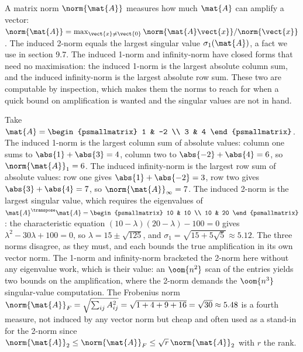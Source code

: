 A matrix norm $\norm{\mat{A}}$ measures how much $\mat{A}$ can
amplify a vector: $\norm{\mat{A}} = \max_{\vect{x} \neq \vect{0}}
\norm{\mat{A}\vect{x}}/\norm{\vect{x}}$. The induced 2-norm equals
the largest singular value $\sigma_{1}(\mat{A})$, a fact we use in
section 9.7. The induced 1-norm and infinity-norm have closed forms
that need no maximisation: the induced 1-norm is the largest
absolute column sum, and the induced infinity-norm is the largest
absolute row sum. These two are computable by inspection, which makes
them the norms to reach for when a quick bound on amplification is
wanted and the singular values are not in hand.

\begin{example}
Take $\mat{A} = \begin{psmallmatrix} 1 & -2 \\ 3 & 4
\end{psmallmatrix}$. The induced 1-norm is the largest column sum of
absolute values: column one sums to $\abs{1} + \abs{3} = 4$, column
two to $\abs{-2} + \abs{4} = 6$, so $\norm{\mat{A}}_{1} = 6$. The
induced infinity-norm is the largest row sum of absolute values: row
one gives $\abs{1} + \abs{-2} = 3$, row two gives $\abs{3} + \abs{4}
= 7$, so $\norm{\mat{A}}_{\infty} = 7$. The induced 2-norm is the
largest singular value, which requires the eigenvalues of
$\mat{A}^{\transpose}\mat{A} = \begin{psmallmatrix} 10 & 10 \\ 10 &
20 \end{psmallmatrix}$: the characteristic equation $(10 - \lambda)
(20 - \lambda) - 100 = 0$ gives $\lambda^{2} - 30\lambda + 100 = 0$,
so $\lambda = 15 \pm \sqrt{125}$, and $\sigma_{1} = \sqrt{15 +
5\sqrt{5}} \approx 5.12$. The three norms disagree, as they must,
and each bounds the true amplification in its own vector norm. The
1-norm and infinity-norm bracketed the 2-norm here without any
eigenvalue work, which is their value: an $\oom{n^{2}}$ scan of the
entries yields two bounds on the amplification, where the 2-norm
demands the $\oom{n^{3}}$ singular-value computation. The Frobenius
norm $\norm{\mat{A}}_{F} = \sqrt{\sum_{ij} A_{ij}^{2}} = \sqrt{1 + 4
+ 9 + 16} = \sqrt{30} \approx 5.48$ is a fourth measure, not induced
by any vector norm but cheap and often used as a stand-in for the
2-norm since $\norm{\mat{A}}_{2} \leq \norm{\mat{A}}_{F} \leq
\sqrt{r}\,\norm{\mat{A}}_{2}$ with $r$ the rank.
\end{example}

